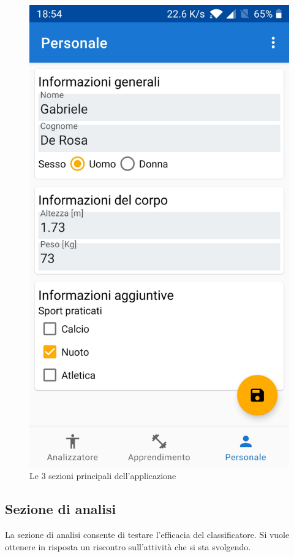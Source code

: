 \begin{figure}[H]
    \includegraphics[scale = 0.1019]{assets/images/screenshots/3a_Init.jpg}
    \caption{Le 3 sezioni principali dell'applicazione}
    \label{fig:screenshots}
\end{figure}


\subsection{Sezione di analisi}
La sezione di analisi consente di testare l'efficacia del classificatore. 
Si vuole ottenere in risposta un riscontro sull'attività che si sta svolgendo.

